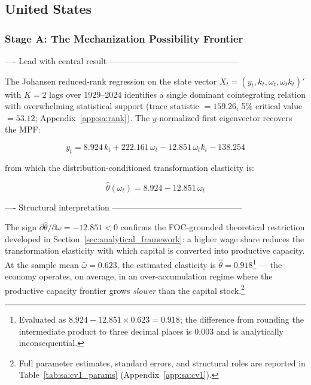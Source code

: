 \documentclass[11pt,a4paper]{article}
\begin{document}
{\subsection{United States}
\label{sec:results_us}

\subsubsection{Stage A: The Mechanization Possibility Frontier}
\label{sec:results_us:stage_a}

 ---- Lead with central result -----------------------------------------------

The Johansen reduced-rank regression on the state vector
$X_t = (y_t, k_t, \omega_t, \omega_t k_t)'$ with $K = 2$ lags over
1929--2024 identifies a single dominant cointegrating relation with
overwhelming statistical support (trace statistic $= 159.26$, 5\%
critical value $= 53.12$; Appendix~\ref{app:sa:rank}). The
$y$-normalized first eigenvector recovers the MPF:

\begin{equation}
	y_t = 8.924\, k_t + 222.161\, \omega_t
	- 12.851\, \omega_t k_t - 138.254
	\label{eq:mpf_us}
\end{equation}

from which the distribution-conditioned transformation elasticity is:

\begin{equation}
	\boxed{\hat{\theta}(\omega_t) = 8.924 - 12.851\,\omega_t}
	\label{eq:theta_us}
\end{equation}

 ---- Structural interpretation -----------------------------------------------

The sign $\partial\hat{\theta}/\partial\omega = -12.851 < 0$ confirms the
FOC-grounded theoretical restriction developed in
Section~\ref{sec:analytical_framework}: a higher wage share reduces the
transformation elasticity with which capital is converted into productive
capacity. At the sample mean $\bar{\omega} = 0.623$, the estimated
elasticity is $\hat{\theta} = 0.918$\footnote{Evaluated as
	$8.924 - 12.851 \times 0.623 = 0.918$; the difference from rounding
	the intermediate product to three decimal places is 0.003 and is
	analytically inconsequential.} --- the economy operates, on average,
in an over-accumulation regime where the productive capacity frontier
grows \emph{slower} than the capital stock.\footnote{Full parameter
	estimates, standard errors, and structural roles are reported in
	Table~\ref{tab:sa:cv1_params} (Appendix~\ref{app:sa:cv1}).}

}
\end{document}
